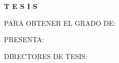 \begin{titlepage}
\begin{minipage}{.7\textwidth}
{      
      \par
      \makeatother
      \vspace{1cm}

  		{\Huge\textbf{\textsc{
  				T \hspace{0.6cm} E \hspace{0.6cm} S \hspace{0.6cm} I \hspace{0.6cm} S  }}}\par
  		\vspace{1cm}

  		{\large\textsc{PARA OBTENER EL GRADO DE:}}\par
      \vspace{0.5cm}

  		\makeatletter
      {\Large{\@grado}}\par
      \makeatother
      \vspace{0.5cm}

  		{\large\textsc{PRESENTA:}}\par
      \vspace{0.3cm}

      \makeatletter
      \par
      \makeatother
      \vspace{0.5cm}

  		{\large\textsc{DIRECTORES DE TESIS:}}\par
      \vspace{0.3cm}

      \makeatletter
      \par
      \vspace{1.5cm}
      \vfill
      {\large\textbf{\@fecha}}
      \makeatother

  	}
  \end{minipage}

  \thispagestyle{empty}
  \vspace*{\fill}

\end{titlepage}
\thispagestyle{empty}
\cleardoublepage
